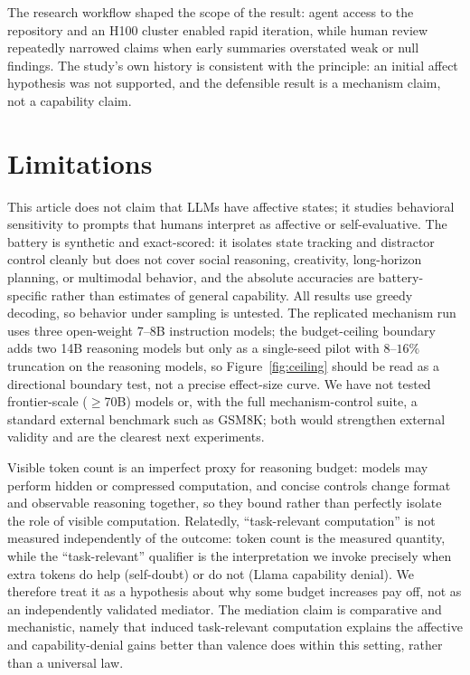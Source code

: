 \documentclass{article}
\begin{document}
The research workflow shaped the scope of the result: agent access to the repository and an H100 cluster enabled rapid iteration, while human review repeatedly narrowed claims when early summaries overstated weak or null findings. The study's own history is consistent with the principle: an initial affect hypothesis was not supported, and the defensible result is a mechanism claim, not a capability claim.

\section{Limitations}

This article does not claim that LLMs have affective states; it studies behavioral sensitivity to prompts that humans interpret as affective or self-evaluative. The battery is synthetic and exact-scored: it isolates state tracking and distractor control cleanly but does not cover social reasoning, creativity, long-horizon planning, or multimodal behavior, and the absolute accuracies are battery-specific rather than estimates of general capability. All results use greedy decoding, so behavior under sampling is untested. The replicated mechanism run uses three open-weight 7--8B instruction models; the budget-ceiling boundary adds two 14B reasoning models but only as a single-seed pilot with $8$--$16\%$ truncation on the reasoning models, so Figure~\ref{fig:ceiling} should be read as a directional boundary test, not a precise effect-size curve. We have not tested frontier-scale ($\geq$70B) models or, with the full mechanism-control suite, a standard external benchmark such as GSM8K; both would strengthen external validity and are the clearest next experiments.

Visible token count is an imperfect proxy for reasoning budget: models may perform hidden or compressed computation, and concise controls change format and observable reasoning together, so they bound rather than perfectly isolate the role of visible computation. Relatedly, ``task-relevant computation'' is not measured independently of the outcome: token count is the measured quantity, while the ``task-relevant'' qualifier is the interpretation we invoke precisely when extra tokens do help (self-doubt) or do not (Llama capability denial). We therefore treat it as a hypothesis about why some budget increases pay off, not as an independently validated mediator. The mediation claim is comparative and mechanistic, namely that induced task-relevant computation explains the affective and capability-denial gains better than valence does within this setting, rather than a universal law.
\end{document}
